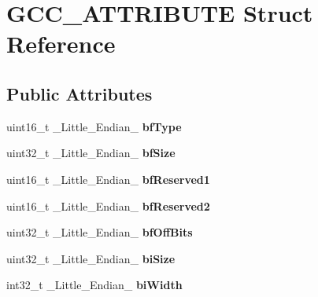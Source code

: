 \hypertarget{structGCC__ATTRIBUTE}{\section{G\-C\-C\-\_\-\-A\-T\-T\-R\-I\-B\-U\-T\-E Struct Reference}
\label{structGCC__ATTRIBUTE}
}
\subsection*{Public Attributes}
\begin{DoxyCompactItemize}
\item 
\hypertarget{structGCC__ATTRIBUTE_a8a270d203f46aebc5c2b79b281314acd}{uint16\-\_\-t \-\_\-\-Little\-\_\-\-Endian\-\_\- {\bfseries bf\-Type}}\label{structGCC__ATTRIBUTE_a8a270d203f46aebc5c2b79b281314acd}

\item 
\hypertarget{structGCC__ATTRIBUTE_ab8a10012c8006abdbccbcae083ca0e32}{uint32\-\_\-t \-\_\-\-Little\-\_\-\-Endian\-\_\- {\bfseries bf\-Size}}\label{structGCC__ATTRIBUTE_ab8a10012c8006abdbccbcae083ca0e32}

\item 
\hypertarget{structGCC__ATTRIBUTE_ad932e4420b9108bc4265413808764454}{uint16\-\_\-t \-\_\-\-Little\-\_\-\-Endian\-\_\- {\bfseries bf\-Reserved1}}\label{structGCC__ATTRIBUTE_ad932e4420b9108bc4265413808764454}

\item 
\hypertarget{structGCC__ATTRIBUTE_a2fb1e71a93a8fb44182c71343197cc01}{uint16\-\_\-t \-\_\-\-Little\-\_\-\-Endian\-\_\- {\bfseries bf\-Reserved2}}\label{structGCC__ATTRIBUTE_a2fb1e71a93a8fb44182c71343197cc01}

\item 
\hypertarget{structGCC__ATTRIBUTE_a9355688d4f6bb1a73baa02e1a02d38f1}{uint32\-\_\-t \-\_\-\-Little\-\_\-\-Endian\-\_\- {\bfseries bf\-Off\-Bits}}\label{structGCC__ATTRIBUTE_a9355688d4f6bb1a73baa02e1a02d38f1}

\item 
\hypertarget{structGCC__ATTRIBUTE_ac4897f001fded3194cb3db2d4415682a}{uint32\-\_\-t \-\_\-\-Little\-\_\-\-Endian\-\_\- {\bfseries bi\-Size}}\label{structGCC__ATTRIBUTE_ac4897f001fded3194cb3db2d4415682a}

\item 
\hypertarget{structGCC__ATTRIBUTE_a924faf6ab6cd24df094984077fc2fe62}{int32\-\_\-t \-\_\-\-Little\-\_\-\-Endian\-\_\- {\bfseries bi\-Width}}\label{structGCC__ATTRIBUTE_a924faf6ab6cd24df094984077fc2fe62}


\end{DoxyCompactItemize}

